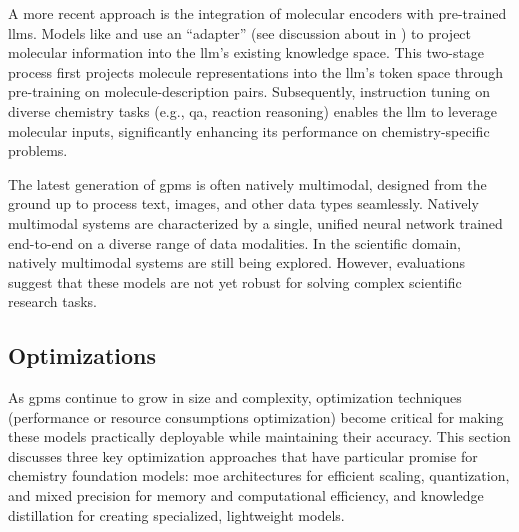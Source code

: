 A more recent approach is the integration of molecular encoders with pre-trained \glspl{llm}. 
Models like  \autocite{cao2023instructmol0} and  \autocite{li2024seeing} use an \enquote{adapter} (see discussion about  in ) to project molecular information into the \gls{llm}'s existing knowledge space. 
This two-stage process first projects molecule representations into the \gls{llm}'s token space through pre-training on molecule-description pairs. 
Subsequently, instruction tuning on diverse chemistry tasks (e.g., \gls{qa}, reaction reasoning) enables the \gls{llm} to leverage molecular inputs, significantly enhancing its performance on chemistry-specific problems.


The latest generation of \glspl{gpm} is often natively multimodal, designed from the ground up to process text, images, and other data types seamlessly. 
Natively multimodal systems are characterized by a single, unified neural network trained end-to-end on a diverse range of data modalities. 
In the scientific domain, natively multimodal systems are still being explored. However, evaluations suggest that these models are not yet robust for solving complex scientific research tasks.\autocite{alampara2024probing}


\subsection{Optimizations}

As \glspl{gpm} continue to grow in size and complexity, optimization techniques (performance or resource consumptions optimization) become critical for making these models practically deployable while maintaining their accuracy. 
This section discusses three key optimization approaches that have particular promise for chemistry foundation models: \gls{moe} architectures for efficient scaling, quantization, and mixed precision for memory and computational efficiency, and knowledge distillation for creating specialized, lightweight models.


